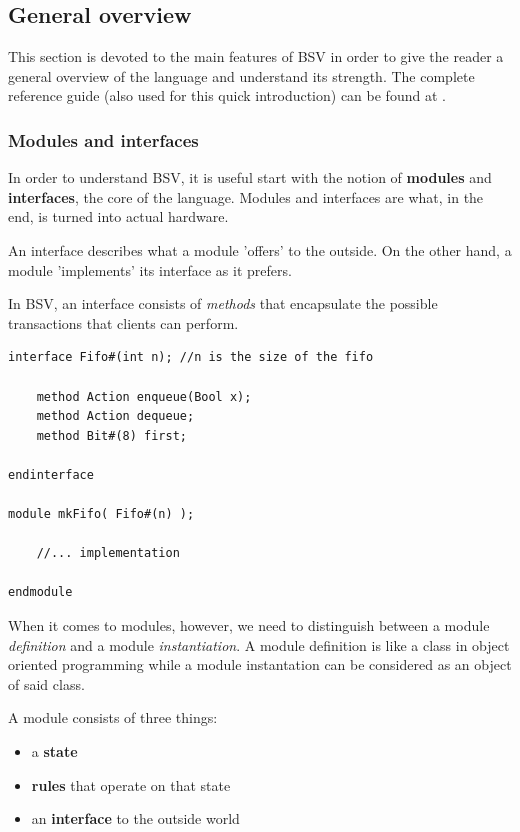 \documentclass[12pt,oneside,a4paper]{article}
\begin{document}
\subsection{General overview}

This section is devoted to the main features of BSV in order to give the reader a general overview of the language and understand its strength. The complete reference guide (also used for this quick introduction) can be found at \cite{bsv_guide}.
\subsubsection{Modules and interfaces}
In order to understand BSV, it is useful start with the notion of \textbf{modules} and \textbf{interfaces}, the core of the language. Modules and interfaces are what, in the end, is turned into actual hardware. 

An interface describes what a module 'offers' to the outside. On the other hand, a module 'implements' its interface as it prefers.

In BSV, an interface consists of \textit{methods} that encapsulate the possible transactions that clients can perform. 

\begin{lstlisting}[label={list:moduleinterface},caption={Example of module and interface}]
interface Fifo#(int n);	//n is the size of the fifo

	method Action enqueue(Bool x);
	method Action dequeue;
	method Bit#(8) first;
	
endinterface

module mkFifo( Fifo#(n) );

	//... implementation
	
endmodule
\end{lstlisting}

When it comes to modules, however, we need to distinguish between a module \textit{definition} and a module \textit{instantiation}. A module definition is like a class in object oriented programming while a module instantation can be considered as an object of said class.

A module consists of three things: 
\begin{itemize}
	\item a \textbf{state}
	\item  \textbf{rules} that operate on that state
	\item an \textbf{interface} to the outside world
\end{itemize}
\end{document}
